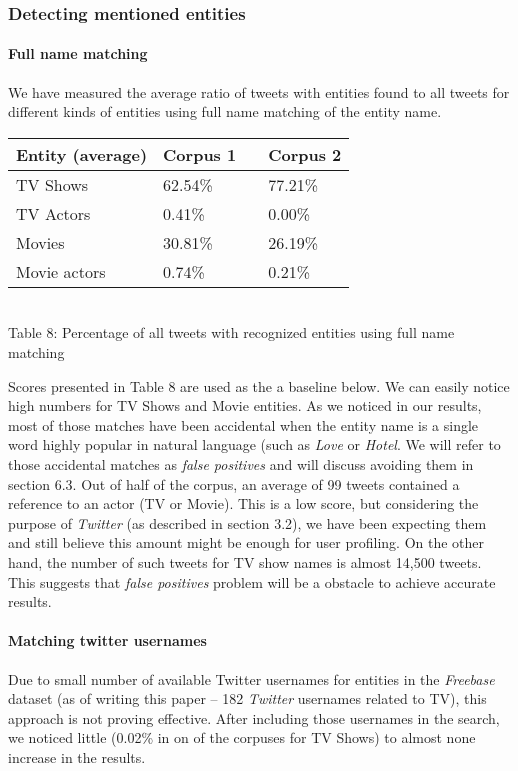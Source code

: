 \subsubsection{Detecting mentioned entities}
\paragraph{Full name matching}
We have measured the average ratio of tweets with entities found to all tweets for different kinds of entities using full name matching of the entity name.

\begin{center}
  \begin{tabular}{ | p{4cm} | p{2cm} | p{1cm}| p{2cm} | } \hline
    Entity (average) & Corpus 1 & & Corpus 2 \\ \hline
    TV Shows & 62.54\% & & 77.21\% \\ \hline
    TV Actors & 0.41\% & & 0.00\% \\ \hline
    Movies & 30.81\% & & 26.19\% \\ \hline
    Movie actors & 0.74\% & & 0.21\% \\ \hline
  \end{tabular} \\
  Table 8: Percentage of all tweets with recognized entities using full name matching \\
\end{center}

Scores presented in Table 8 are used as the a baseline below. We can easily notice high numbers for TV Shows and
Movie entities. As we noticed in our results, most of those matches have been accidental when the entity name is a single
word highly popular in natural language (such as \textit{Love} or \textit{Hotel}. We will refer to those accidental
matches as \textit{false positives} and will discuss avoiding them in section 6.3. Out of half of the corpus, an average of 99 tweets contained a reference to an actor (TV or Movie). This is a low score, but considering the purpose of \textit{Twitter} (as described in section 3.2), we have been expecting them and still believe this amount might be enough for user profiling. On the other hand, the number of such tweets for TV show names is almost 14,500 tweets. This suggests
that \textit{false positives} problem will be a obstacle to achieve accurate results.

\paragraph{Matching twitter usernames}
Due to small number of available Twitter usernames for entities in the \textit{Freebase} dataset (as of writing this paper -- 182 \textit{Twitter} usernames related to TV), this approach is not proving effective. After including those usernames in the search,
we noticed little (0.02\% in on of the corpuses for TV Shows) to almost none increase in the results.

